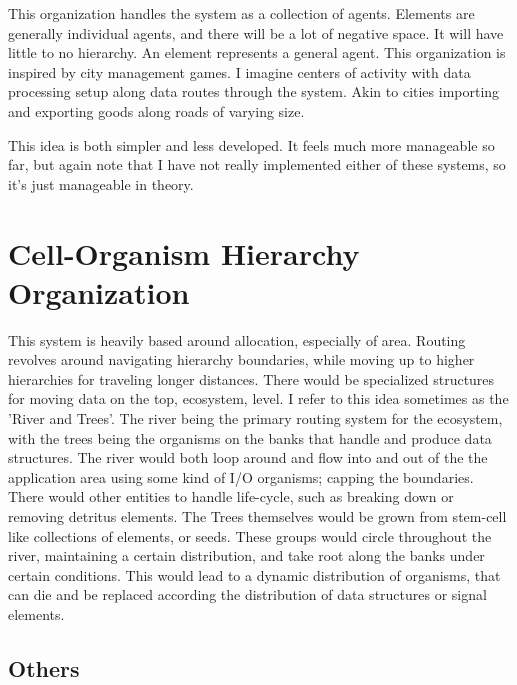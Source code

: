 \documentclass[article,12pt,oneside]{memoir}
\begin{document}
This organization handles the system as a collection of agents.
Elements are generally individual agents, and there will be a lot of negative space.
It will have little to no hierarchy.
An element represents a general agent.
This organization is inspired by city management games.
I imagine centers of activity with data processing setup along data routes through the system.
Akin to cities importing and exporting goods along roads of varying size.

This idea is both simpler and less developed.
It feels much more manageable so far, but again note that I have not really implemented either of these systems, so it's just manageable in theory.


\pagebreak
\chapter{Cell-Organism Hierarchy Organization}


This system is heavily based around allocation, especially of area.
Routing revolves around navigating hierarchy boundaries, while moving up to higher hierarchies for traveling longer distances.
There would be specialized structures for moving data on the top, ecosystem, level.
I refer to this idea sometimes as the 'River and Trees'.
The river being the primary routing system for the ecosystem, with the trees being the organisms on the banks that handle and produce data structures.
The river would both loop around and flow into and out of the the application area using some kind of I/O organisms; capping the boundaries.
There would other entities to handle life-cycle, such as breaking down or removing detritus elements.
The Trees themselves would be grown from stem-cell like collections of elements, or seeds.
These groups would circle throughout the river, maintaining a certain distribution, and take root along the banks under certain conditions.
This would lead to a dynamic distribution of organisms, that can die and be replaced according the distribution of data structures or signal elements.


\section{Others}
\end{document}

